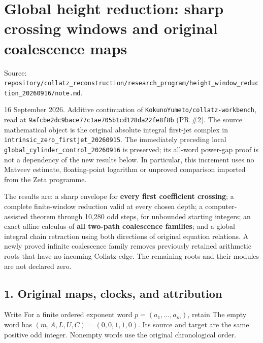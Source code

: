 \chapter{Global height reduction: sharp crossing windows and original
coalescence maps}
{\small\sffamily Source: \nolinkurl{repository/collatz_reconstruction/research_program/height_window_reduction_20260916/note.md}.\par}


16 September 2026. Additive continuation of
\nolinkurl{KokunoYumeto/collatz-workbench}, read at
\nolinkurl{9afcbe2dc9bace77c1ae705b1cd128da22fe8f8b} (PR \#2). The
source mathematical object is the original absolute integral first-jet
complex in \nolinkurl{intrinsic_zero_firstjet_20260915}. The immediately
preceding local \nolinkurl{global_cylinder_control_20260916} is
preserved; its all-word power-gap proof is not a dependency of the new
results below. In particular, this increment uses no Matveev estimate,
floating-point logarithm or unproved comparison imported from the Zeta
programme.

The results are: a sharp envelope for \textbf{every first coefficient
crossing}; a complete finite-window reduction valid at every chosen
depth; a computer-assisted theorem through 10,280 odd steps, for
unbounded starting integers; an exact affine calculus of \textbf{all
two-path coalescence families}; and a global integral chain retraction
using both directions of original equation relations. A newly proved
infinite coalescence family removes previously retained arithmetic roots
that have no incoming Collatz edge. The remaining roots and their
modules are not declared zero.

\section{1. Original maps, clocks, and attribution}

Write
For a finite ordered exponent word \(p=(a_1,\ldots,a_m)\), retain
The empty word has \((m,A,L,U,C)=(0,0,1,1,0)\). Its source and target
are the same positive odd integer. Nonempty words use the original
chronological order.

